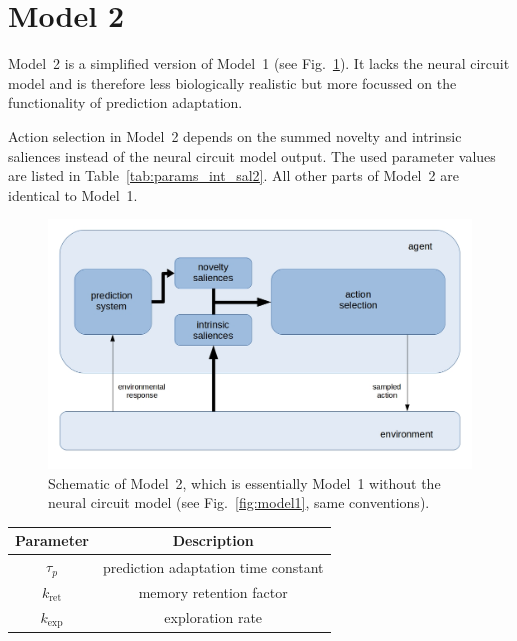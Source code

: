 \documentclass[a4paper]{scrreprt}
\begin{document}
\section{Model 2}
\label{sec:met_model2}

Model~2 is a simplified version of Model~1 (see Fig.~\ref{fig:model2}). It lacks the neural circuit model and is therefore less biologically realistic but more focussed on the functionality of prediction adaptation.

Action selection in Model~2 depends on the summed novelty and intrinsic saliences instead of the neural circuit model output.
The used parameter values are listed in Table~\ref{tab:params_int_sal2}. All other parts of Model~2 are identical to Model~1.


\begin{figure}
\centering
\includegraphics[width=\linewidth]{figs/model_schematic/model_schematic2.jpg}
\caption{Schematic of Model~2, which is essentially Model~1 without the neural circuit model (see Fig.~\ref{fig:model1}, same conventions).}
\label{fig:model2}
\end{figure}

\begin{center}
\begin{tabular}{ c  c }
\hline
Parameter & Description\\
\hline
$\tau_p$ & prediction adaptation time constant\\
$k_{\text{ret}}$ & memory retention factor\\
$k_{\text{exp}}$ & exploration rate\\
\hline
\end{tabular}
\label{tab:params_free2}
\end{center}
\end{document}

